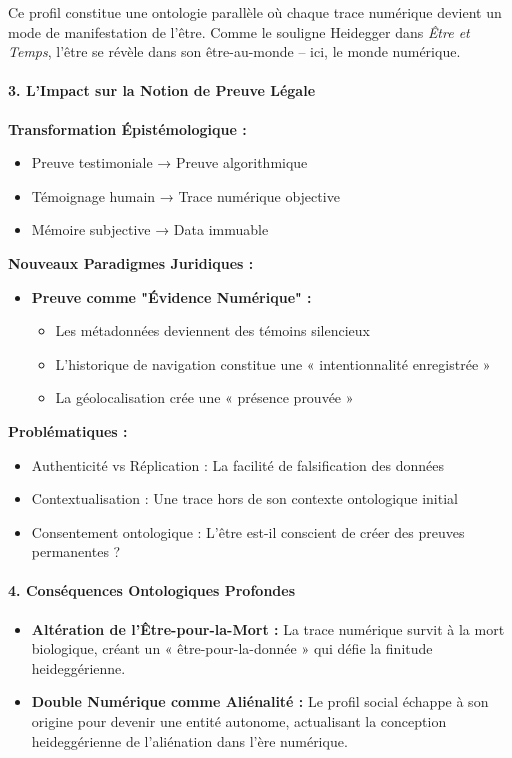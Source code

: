 \documentclass[12pt]{article}
\begin{document}
Ce profil constitue une ontologie parallèle où chaque trace numérique devient un mode de manifestation de l'être. Comme le souligne Heidegger dans \emph{Être et Temps}, l'être se révèle dans son être-au-monde -- ici, le monde numérique.

\paragraph{3. L'Impact sur la Notion de Preuve Légale}

\textbf{Transformation Épistémologique :}
\begin{itemize}
\item Preuve testimoniale → Preuve algorithmique
\item Témoignage humain → Trace numérique objective
\item Mémoire subjective → Data immuable
\end{itemize}

\textbf{Nouveaux Paradigmes Juridiques :}

\begin{itemize}
\item \textbf{Preuve comme "Évidence Numérique" :}
  \begin{itemize}
  \item Les métadonnées deviennent des témoins silencieux
  \item L'historique de navigation constitue une « intentionnalité enregistrée »
  \item La géolocalisation crée une « présence prouvée »
  \end{itemize}
\end{itemize}

\textbf{Problématiques :}
\begin{itemize}
\item Authenticité vs Réplication : La facilité de falsification des données
\item Contextualisation : Une trace hors de son contexte ontologique initial
\item Consentement ontologique : L'être est-il conscient de créer des preuves permanentes ?
\end{itemize}

\paragraph{4. Conséquences Ontologiques Profondes}

\begin{itemize}
\item \textbf{Altération de l'Être-pour-la-Mort :} La trace numérique survit à la mort biologique, créant un « être-pour-la-donnée » qui défie la finitude heideggérienne.
\item \textbf{Double Numérique comme Aliénalité :} Le profil social échappe à son origine pour devenir une entité autonome, actualisant la conception heideggérienne de l'aliénation dans l'ère numérique.
\end{itemize}
\end{document}
